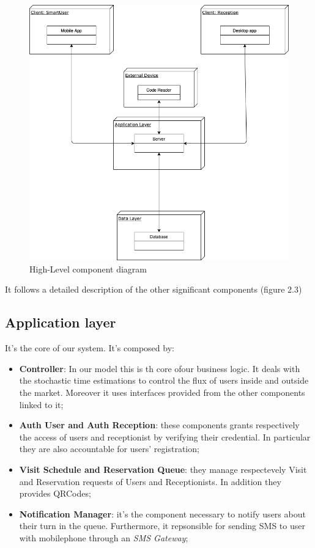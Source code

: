 \begin{figure}[H]
  \label{fig:highlevel}
  \centering
  \includegraphics[scale=0.25]{diagrams/h_level.png}
  \caption{High-Level component diagram}
\end{figure}



It follows a detailed description of the other significant components (figure 2.3)
\subsection{Application layer}
It's the core of our system. It's composed by:
\begin{itemize}
\item \textbf{Controller}: In our model this is th core ofour business logic. It deals with the stochastic time estimations to control the flux of users inside and outside the market. Moreover it uses interfaces provided from the other components linked to it;
\item \textbf{Auth User and Auth Reception}: these components grants respectively the access of users and receptionist by verifying their credential. In particular they are also accountable for users' registration;
\item \textbf{Visit Schedule and Reservation Queue}: they manage respectevely Visit and Reservation requests of Users and Receptionists. In addition they provides QRCodes;
\item \textbf{Notification Manager}: it's the component necessary to notify users about their turn in the queue. Furthermore, it repsonsible for sending SMS to user with mobilephone through an \textit{SMS Gateway};
\end{itemize}


